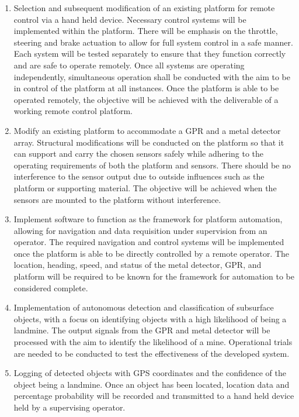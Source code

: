 \documentclass[main.tex]{subfiles}
\begin{document}
\begin{enumerate}
\item Selection and subsequent modification of an existing platform for remote control via a hand held device. Necessary control systems will be implemented within the platform. There will be emphasis on the throttle, steering and brake actuation to allow for full system control in a safe manner. Each system will be tested separately to ensure that they function correctly and are safe to operate remotely. Once all systems are operating independently, simultaneous operation shall be conducted with the aim to be in control of the platform at all instances. Once the platform is able to be operated remotely, the objective will be achieved with the deliverable of a working remote control platform.

\item Modify an existing platform to accommodate a GPR and a metal detector array. Structural modifications will be conducted on the platform so that it can support and carry the chosen sensors safely while adhering to the operating requirements of both the platform and sensors. There should be no interference to the sensor output due to outside influences such as the platform or supporting material. The objective will be achieved when the sensors are mounted to the platform without interference.

\item Implement software to function as the framework for platform automation, allowing for navigation and data requisition under supervision from an operator. The required navigation and control systems will be implemented once the platform is able to be directly controlled by a remote operator. The location, heading, speed, and status of the metal detector, GPR, and platform will be required to be known for the framework for automation to be considered complete.

\item Implementation of autonomous detection and classification of subsurface objects, with a focus on identifying objects with a high likelihood of being a landmine. The output signals from the GPR and metal detector will be processed with the aim to identify the likelihood of a mine. Operational trials are needed to be conducted to test the effectiveness of the developed system. 

\item Logging of detected objects with GPS coordinates and the confidence of the object being a landmine. Once an object has been located, location data and percentage probability will be recorded and transmitted to a hand held device held by a supervising operator.
\end{enumerate}
\end{document}
